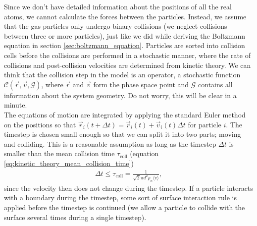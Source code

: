 Since we don't have detailed information about the positions of all the real atoms, we cannot calculate the forces between the particles. Instead, we assume that the gas particles only undergo binary collisions (we neglect collisions between three or more particles), just like we did while deriving the Boltzmann equation in section \ref{sec:boltzmann_equation}. Particles are sorted into collision cells before the collisions are performed in a stochastic manner, where the rate of collisions and post-collision velocities are determined from kinetic theory. We can think that the collision step in the model is an operator, a stochastic function $\mathcal{C}(\vec r, \vec v, \mathcal{G})$, where $\vec r$ and $\vec v$ form the phase space point and $\mathcal G$ contains all information about the system geometry. Do not worry, this will be clear in a minute.\\
The equations of motion are integrated by applying the standard Euler method on the positions so that $\vec r_i(t+\Delta t) = \vec r_i(t) + \vec v_i(t)\Delta t$ for particle $i$. The timestep is chosen small enough so that we can split it into two parts; moving and colliding. This is a reasonable assumption as long as the timestep $\Delta t$ is smaller than the mean collision time $\tau_\text{coll}$ (equation \eqref{eq:kinetic_theory_mean_collision_time})
\begin{align}
	\Delta t \leq \tau_\text{coll} = \frac{1}{\sqrt 2 \pi d^2 \rho_n \langle v \rangle},
\end{align}
since the velocity then does not change during the timestep. If a particle interacts with a boundary during the timestep, some sort of surface interaction rule is applied before the timestep is continued (we allow a particle to collide with the surface several times during a single timestep).

